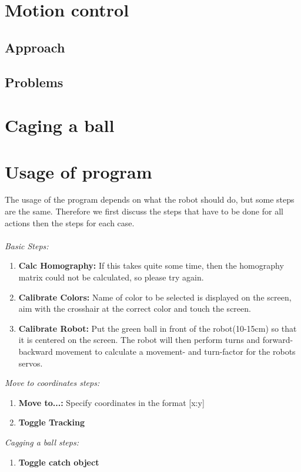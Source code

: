 \documentclass[703031]{iisreport}
\begin{document}
\section{Motion control}
\subsection{Approach}


\subsection{Problems}


\section{Caging a ball}


\section{Usage of program}
The usage of the program depends on what the robot should do, but some steps are the same. Therefore we first discuss the steps that have to be done for all actions then the steps for each case.\\\\
\emph{Basic Steps:}
	\begin{enumerate}
		\item \textbf{Calc Homography:} If this takes quite some time, then the homography matrix could not be calculated, so please try again.
		\item \textbf{Calibrate Colors:} Name of color to be selected is displayed on the screen, aim with the crosshair at the correct color and touch the screen.
		\item \textbf{Calibrate Robot:} Put the green ball in front of the robot(10-15cm) so that it is centered on the screen. The robot will then perform turns and forward-backward movement to calculate a movement- and turn-factor for the robots servos.\\
	\end{enumerate}
\emph{Move to coordinates steps:}
	\begin{enumerate}
		\item \textbf{Move to...:} Specify coordinates in the format [x:y]
		\item \textbf{Toggle Tracking}\\
	\end{enumerate}
\emph{Cagging a ball steps:}
	\begin{enumerate}
		\item \textbf{Toggle catch object}
	\end{enumerate}
\end{document}
